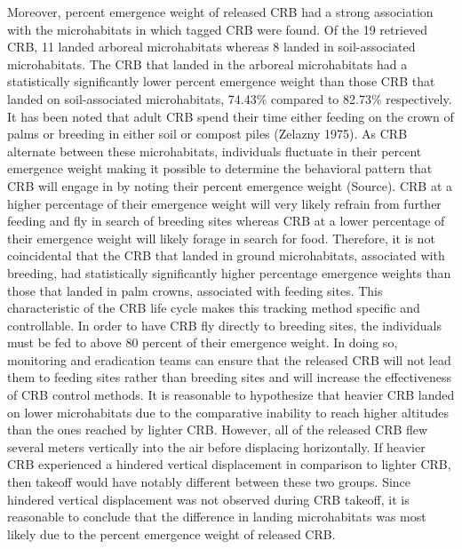 \documentclass[11pt,letterpaper]{scrartcl}
\begin{document}
Moreover, percent emergence weight of released CRB had a strong association with the microhabitats in which tagged CRB were found. Of the 19 retrieved CRB, 11 landed arboreal microhabitats whereas 8 landed in soil-associated microhabitats. The CRB that landed in the arboreal microhabitats had a statistically significantly lower percent emergence weight than those CRB that landed on soil-associated microhabitats, 74.43\% compared to 82.73\% respectively. It has been noted that adult CRB spend their time either feeding on the crown of palms or breeding in either soil or compost piles (Zelazny 1975). As CRB alternate between these microhabitats, individuals fluctuate in their percent emergence weight making it possible to determine the behavioral pattern that CRB will engage in by noting their percent emergence weight (Source).  CRB at a higher percentage of their emergence weight will very likely refrain from further feeding and fly in search of breeding sites whereas CRB at a lower percentage of their emergence weight will likely forage in search for food. Therefore, it is not coincidental that the CRB that landed in ground microhabitats, associated with breeding, had statistically significantly higher percentage emergence weights than those that landed in palm crowns, associated with feeding sites. This characteristic of the CRB life cycle makes this tracking method specific and controllable. In order to have CRB fly directly to breeding sites, the individuals must be fed to above 80 percent of their emergence weight. In doing so, monitoring and eradication teams can ensure that the released CRB will not lead them to feeding sites rather than breeding sites and will increase the effectiveness of CRB control methods. It is reasonable to hypothesize that heavier CRB landed on lower microhabitats due to the comparative inability to reach higher altitudes than the ones reached by lighter CRB. However, all of the released CRB flew several meters vertically into the air before displacing horizontally. If heavier CRB experienced a hindered vertical displacement in comparison to lighter CRB, then takeoff would have notably different between these two groups. Since hindered vertical displacement was not observed during CRB takeoff, it is reasonable to conclude that the difference in landing microhabitats was most likely due to the percent emergence weight of released CRB. 
\end{document}

